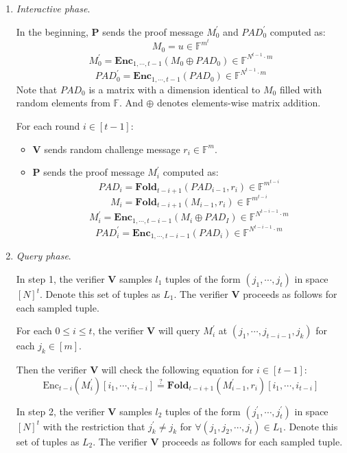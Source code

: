 \begin{enumerate}
    \item \textit{Interactive phase}. 
    
    In the beginning, $\textbf{P}$ sends the proof message $M_0^{\prime}$ and $PAD_0^{\prime}$ computed as:
$$
    M_0 = u \in \mathbb{F}^{m^t}
$$
$$
    M_0^{\prime} = \textbf{Enc}_{1,\cdots,t-1}(M_0 \oplus PAD_0) \in \mathbb{F}^{N^{t-1} \cdot m}
$$
$$
    PAD_0^{\prime} = \textbf{Enc}_{1,\cdots,t-1}(PAD_0) \in \mathbb{F}^{N^{t-1} \cdot m}
$$
    Note that $PAD_0$ is a matrix with a dimension identical to $M_0$ filled with random elements from $\mathbb{F}$. And $\oplus$ denotes elements-wise matrix addition.
    
    For each round $i \in [t-1]$:
    \begin{itemize}
        \item $\textbf{V}$ sends random challenge message $r_i \in \mathbb{F}^m$.
        \item $\textbf{P}$ sends the proof message $M_i^{\prime}$ computed as:
$$
    PAD_i = \textbf{Fold}_{t-i+1}(PAD_{i-1}, r_i) \in \mathbb{F}^{m^{t-i}}
$$
$$
    M_i = \textbf{Fold}_{t-i+1}(M_{i-1}, r_i) \in \mathbb{F}^{m^{t-i}}
$$
$$
    M_i^\prime =  \textbf{Enc}_{1, \cdots, t- i - 1}(M_i \oplus PAD_I) \in \mathbb{F}^{N^{t-i-1} \cdot m}
$$
$$
    PAD_i^\prime =  \textbf{Enc}_{1, \cdots, t- i - 1}(PAD_i) \in \mathbb{F}^{N^{t-i-1} \cdot m}
$$

    \end{itemize}
    \item \textit{Query phase}. 
    
    In step 1, the verifier $\textbf{V}$ samples $l_1$ tuples of the form $(j_1, \cdots, j_t)$ in space $[N]^t$. Denote this set of tuples as $L_1$.
    The verifier $\textbf{V}$ proceeds as follows for each sampled tuple.
    
    For each $0 \le i \le t$, 
    the verifier $\textbf{V}$ will query $M_{i}^{\prime}$ at $(j_1, \cdots, j_{t-i-1}, j_k)$ for each $j_k \in [m]$. 
    
    Then the verifier $\textbf{V}$ will check the following equation for $i \in [t-1]$:
\begin{equation}
\label{eq:szkpctc_eq}
    \text{Enc}_{t-i}(M_i^\prime)[i_1, \cdots, i_{t-i}] \stackrel{?}{=} \textbf{Fold}_{t-i+1}(M_{i-1}^\prime, r_i) [i_1, \cdots, i_{t-i}]
\end{equation}

    In step 2, the verifier $\textbf{V}$ samples $l_2$ tuples of the form $(j_1^\prime, \cdots, j_t^\prime)$ in space $[N]^t$ with the restriction that $j_k^\prime \neq j_k$ for $\forall (j_1, j_2, \cdots, j_t) \in L_1$. Denote this set of tuples as $L_2$.
    The verifier $\textbf{V}$ proceeds as follows for each sampled tuple.
    

\end{enumerate}

